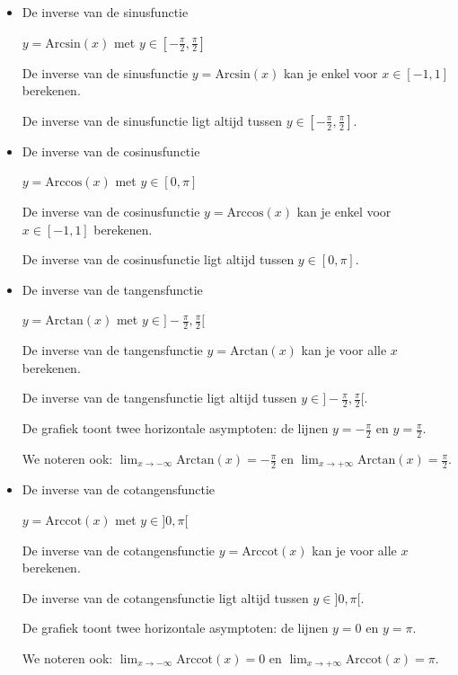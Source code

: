\begin{itemize}
\item{De inverse van de sinusfunctie}

$y=\textrm{Arcsin}(x)$ met $y\in[-\frac{\pi}{2},\frac{\pi}{2}]$

De inverse van de sinusfunctie $y=\textrm{Arcsin}(x)$ kan je enkel
voor $x\in[-1,1]$ berekenen.

De inverse van de sinusfunctie ligt altijd tussen $y\in[-\frac{\pi}{2},\frac{\pi}{2}]$.



\item{De inverse van de cosinusfunctie}

$y=\textrm{Arccos}(x)$ met $y\in[0,\pi]$

De inverse van de cosinusfunctie $y=\textrm{Arccos}(x)$ kan je enkel
voor $x\in[-1,1]$ berekenen.

De inverse van de cosinusfunctie ligt altijd tussen $y\in[0,\pi]$.


\item{De inverse van de tangensfunctie}

$y=\textrm{Arctan}(x)$ met $y\in]-\frac{\pi}{2},\frac{\pi}{2}[$

De inverse van de tangensfunctie $y=\textrm{Arctan}(x)$ kan je voor
alle $x$ berekenen.

De inverse van de tangensfunctie ligt altijd tussen $y\in]-\frac{\pi}{2},\frac{\pi}{2}[$.

De grafiek toont twee horizontale asymptoten: de lijnen $y=-\frac{\pi}{2}$
en $y=\frac{\pi}{2}$.

We noteren ook: $\lim_{x\to-\infty}\textrm{Arctan}(x)=-\frac{\pi}{2}$
en $\lim_{x\to+\infty}\textrm{Arctan}(x)=\frac{\pi}{2}$.


\item{De inverse van de cotangensfunctie}

$y=\textrm{Arccot}(x)$ met $y\in]0,\pi[$

De inverse van de cotangensfunctie $y=\textrm{Arccot}(x)$ kan je
voor alle $x$ berekenen.

De inverse van de cotangensfunctie ligt altijd tussen $y\in]0,\pi[$.

De grafiek toont twee horizontale asymptoten: de lijnen $y=0$ en
$y=\pi$.

We noteren ook: $\lim_{x\to-\infty}\textrm{Arccot}(x)=0$
en $\lim_{x\to+\infty}\textrm{Arccot}(x)=\pi$.

\end{itemize}

